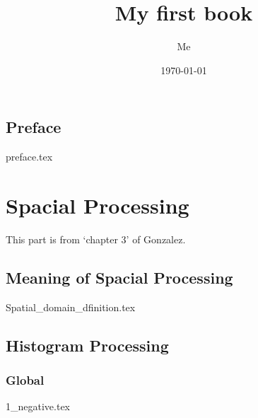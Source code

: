 \documentclass{book}
\title{My first book}
\author{Me}
\date{\today}
\begin{document}

\maketitle

\frontmatter

\tableofcontents

\listoffigures

\chapter{Preface}
{preface.tex}

\mainmatter
\part{Spacial Processing}
This part is from `chapter 3' of Gonzalez.

\chapter{Meaning of Spacial Processing}

{Spatial_domain_dfinition.tex}


\chapter{Histogram Processing}

\section{Global}

{1_negative.tex}
\end{document}
